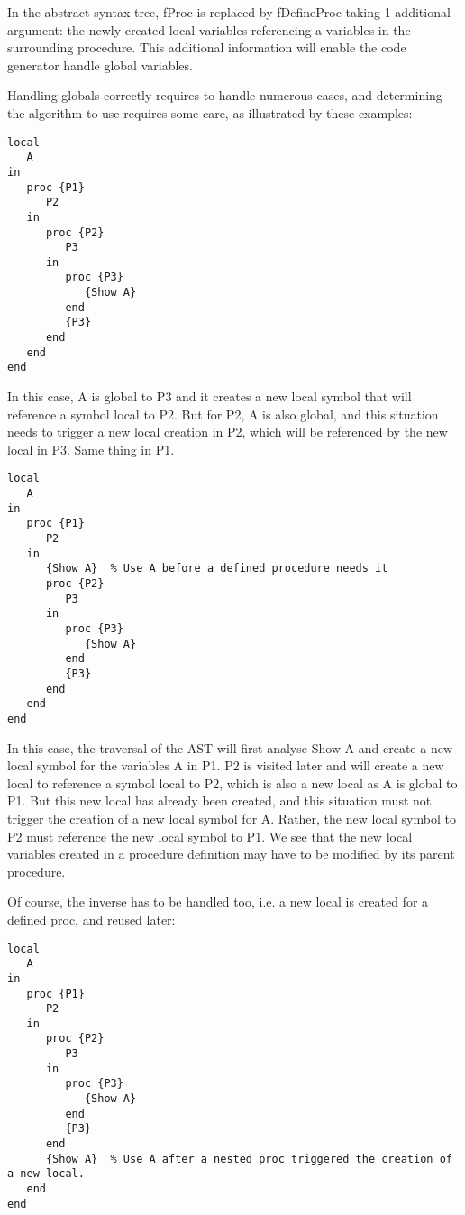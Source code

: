 \documentclass[a4paper]{memoir}
\begin{document}
In the abstract syntax tree, fProc is replaced by fDefineProc taking 1 additional argument: the newly created local variables referencing a variables in the surrounding procedure. This additional information will enable the code generator handle global variables.

Handling globals correctly requires to handle numerous cases, and determining the algorithm to use requires some care, as illustrated by these examples:

\begin{lstlisting}
local
   A
in
   proc {P1}
      P2
   in
      proc {P2}
         P3
      in
         proc {P3}
            {Show A}
         end
         {P3}
      end
   end
end
\end{lstlisting}
In this case, A is global to P3 and it creates a new local symbol that will reference a symbol local to P2. But for P2, A is also global, and this situation needs to trigger a new local creation in P2, which will be referenced by the new local in P3. Same thing in P1.

\begin{lstlisting}
local
   A
in
   proc {P1}
      P2
   in
      {Show A}  % Use A before a defined procedure needs it
      proc {P2}
         P3
      in
         proc {P3}
            {Show A}
         end
         {P3}
      end
   end
end
\end{lstlisting}

In this case, the traversal of the AST will first analyse {Show A} and create a new local symbol for the variables A in P1. P2 is visited later and will create a new local to reference a symbol local to P2, which is also a new local as A is global to P1. But this new local has already been created, and this situation must not trigger the creation of a new local symbol for A. Rather, the new local symbol to P2 must reference the new local symbol to P1. We see that the new local variables created in a procedure definition may have to be modified by its parent procedure.

Of course, the inverse has to be handled too, i.e. a new local is created for a defined proc, and reused later:

\begin{lstlisting}
local
   A
in
   proc {P1}
      P2
   in
      proc {P2}
         P3
      in
         proc {P3}
            {Show A}
         end
         {P3}
      end
      {Show A}  % Use A after a nested proc triggered the creation of a new local.
   end
end
\end{lstlisting}
\end{document}
